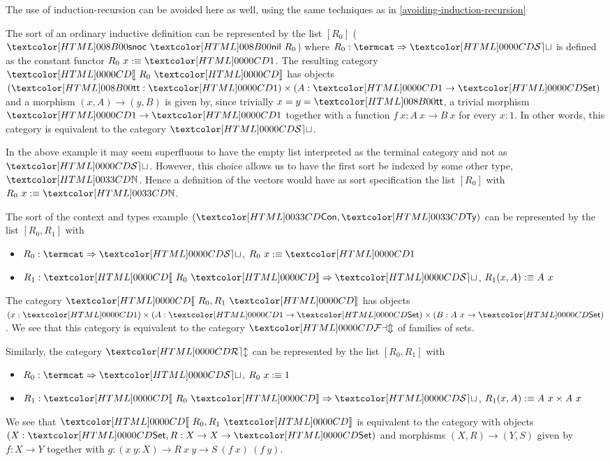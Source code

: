 \begin{remark}
  The use of induction-recursion can be avoided here as well, using
  the same techniques as in \cref{avoiding-induction-recursion}
\end{remark}

\begin{example}
  The sort of an ordinary inductive definition can be represented by
  the list $[R_0]$ (\ie $\sortssnoc\ \sortsnil\ R_0$) where
  $R_0 : \Func{\termcat}{\SET}$ is defined as the constant functor
  $R_0\ x \ddefeq \unitty$. The resulting category $\SortCat{R_0}$ has
  objects $(\unitval : \unitty) \times (A : \unitty \to \Set)$ and a
  morphism $(x, A) \to (y, B)$ is given by, since trivially
  $x = y = \unitval$, a trivial morphism $\unitty \to \unitty$
  together with a function $f\ x : A\ x \to B\ x$ for every $x : 1$. In
  other words, this category is equivalent to the category $\SET$.
\end{example}

In the above example it may seem superfluous to have the empty list
interpreted as the terminal category and not as $\SET$. However, this
choice allows us to have the first sort be indexed by some other type,
\eg $\natty$. Hence a definition of the vectors would have as sort
specification the list $[R_0]$ with $R_0\ x \ddefeq \natty$.

\begin{example}
  The sort of the context and types example $(\ttconty, \tttyty)$ can be
  represented by the list $[R_0, R_1]$ with
  \begin{itemize}
  \item $R_0 : \Func{\termcat}{\SET}$, $R_0\ x \ddefeq \unitty$
  \item $R_1 : \Func{\SortCat{R_0}}{\SET}$, $R_1 (x, A) :\equiv A\ x$
  \end{itemize}
  The category $\SortCat{R_0,R_1}$ has objects
  $(x : \unitty) \times (A : \unitty \to \Set) \times (B : A\ x \to
  \Set)$.
  We see that this category is equivalent to the category $\FAM$ of
  families of sets.
\end{example}

\begin{example}
  \label{rel-sorts}
  Similarly, the category $\REL$ can be represented by the list
  $[R_0, R_1]$ with
  \begin{itemize}
  \item $R_0 : \Func{\termcat}{\SET}$, $R_0\ x :\equiv 1$
  \item $R_1 : \Func{\SortCat{R_0}}{\SET}$, $R_1 (x, A) :\equiv A\ x \times A\ x$
  \end{itemize}
  We see that $\SortCat{R_0,R_1}$ is equivalent to the category with
  objects $(X : \Set, R : X \to X \to \Set)$ and morphisms
  $(X,R) \to (Y,S)$ given by $f : X \to Y$ together with
  $g : (x\ y: X) \to R\ x\ y \to S\ (f\ x)\ (f\ y)$.
\end{example}

